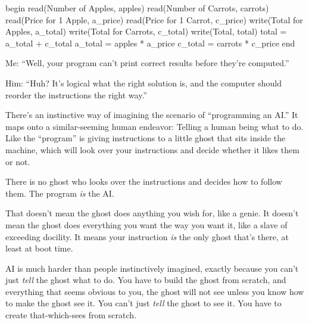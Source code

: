 {
 begin\newline
 read({\textquotedbl}Number of Apples{\textquotedbl}, apples)\newline
 read({\textquotedbl}Number of Carrots{\textquotedbl}, carrots)\newline
 read({\textquotedbl}Price for 1 Apple{\textquotedbl}, a\_price)\newline
 read({\textquotedbl}Price for 1 Carrot{\textquotedbl},
c\_price)\newline
 write({\textquotedbl}Total for Apples{\textquotedbl}, a\_total)\newline
 write({\textquotedbl}Total for Carrots{\textquotedbl},
c\_total)\newline
 write({\textquotedbl}Total{\textquotedbl}, total)\newline
 total = a\_total + c\_total\newline
 a\_total = apples * a\_price\newline
 c\_total = carrots * c\_price\newline
 end\newline
}

{
 Me: ``Well, your program can't
print correct results before they're
computed.''}

{
 Him: ``Huh? It's logical what the
right solution is, and the computer should reorder the instructions the
right way.''}

{
 There's an instinctive way of imagining the
scenario of ``programming an AI.''
It maps onto a similar-seeming human endeavor: Telling a human being
what to do. Like the ``program'' is
giving instructions to a little ghost that sits inside the machine,
which will look over your instructions and decide whether it likes them
or not.}

{
 There is no ghost who looks over the instructions and decides how
to follow them. The program \textit{is} the AI.}

{
 That doesn't mean the ghost does anything you wish
for, like a genie. It doesn't mean the ghost does
everything you want the way you want it, like a slave of exceeding
docility. It means your instruction \textit{is} the only ghost
that's there, at least at boot time.}

{
 AI is much harder than people instinctively imagined, exactly
because you can't just \textit{tell} the ghost what to
do. You have to build the ghost from scratch, and everything that seems
obvious to you, the ghost will not see unless you know how to make the
ghost see it. You can't just \textit{tell} the ghost to
see it. You have to create that-which-sees from scratch.}

